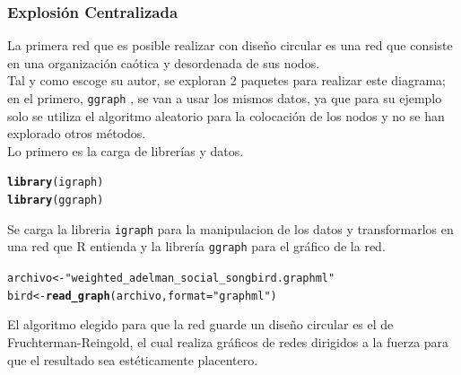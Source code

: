 \documentclass{article}\usepackage[]{graphicx}\usepackage[]{color}
\makeatletter
\newcommand{\hlstr}[1]{\textcolor[rgb]{0.192,0.494,0.8}{#1}}%
\newcommand{\hlstd}[1]{\textcolor[rgb]{0.345,0.345,0.345}{#1}}%
\newcommand{\hlkwb}[1]{\textcolor[rgb]{0.69,0.353,0.396}{#1}}%
\newcommand{\hlkwc}[1]{\textcolor[rgb]{0.333,0.667,0.333}{#1}}%
\newcommand{\hlkwd}[1]{\textcolor[rgb]{0.737,0.353,0.396}{\textbf{#1}}}%
\newenvironment{kframe}{%
 \def\at@end@of@kframe{}%
 \ifinner\ifhmode%
  \def\at@end@of@kframe{\end{minipage}}%
  \begin{minipage}{\columnwidth}%
 \fi\fi%
 \def\FrameCommand##1{\hskip\@totalleftmargin \hskip-\fboxsep
 \colorbox{shadecolor}{##1}\hskip-\fboxsep
     \hskip-\linewidth \hskip-\@totalleftmargin \hskip\columnwidth}%
 \MakeFramed {\advance\hsize-\width
   \@totalleftmargin\z@ \linewidth\hsize
   \@setminipage}}%
 {\par\unskip\endMakeFramed%
 \at@end@of@kframe}
\newenvironment{knitrout}{}{} %
\makeatother
\begin{document}
\subsubsection{Explosi\'on Centralizada}
La primera red que es posible realizar con dise\~no circular es una red que consiste en una organizaci\'on ca\'otica y desordenada de sus nodos.~\\
Tal y como escoge su autor, se exploran 2 paquetes para realizar este diagrama; en el primero, \texttt{ggraph} \cite{docu_ggraph}
, se van a usar los mismos datos, ya que para su ejemplo solo se utiliza el algoritmo aleatorio para la colocaci\'on de los nodos y no se han explorado otros m\'etodos.~\\
Lo primero es la carga de librer\'ias y datos.
\begin{knitrout}
\color{fgcolor}\begin{kframe}
\begin{alltt}
\hlkwd{library}\hlstd{(igraph)}
\hlkwd{library}\hlstd{(ggraph)}
\end{alltt}
\end{kframe}
\end{knitrout}
Se carga la libreria \texttt{igraph} \cite{docu_igraph}
para la manipulacion de los datos y transformarlos en una red que R entienda y la librer\'ia \texttt{ggraph} para el gr\'afico de la red.
\begin{knitrout}
\color{fgcolor}\begin{kframe}
\begin{alltt}
\hlstd{archivo} \hlkwb{<-}\hlstr{"weighted_adelman_social_songbird.graphml"}
\hlstd{bird} \hlkwb{<-} \hlkwd{read_graph}\hlstd{( archivo ,} \hlkwc{format} \hlstd{=}\hlstr{"graphml"}\hlstd{)}
\end{alltt}
\end{kframe}
\end{knitrout}
El algoritmo elegido para que la red guarde un dise\~no circular es el de Fruchterman-Reingold, el cual realiza gr\'aficos de redes dirigidos a la fuerza para que el resultado sea est\'eticamente placentero.
\end{document}
